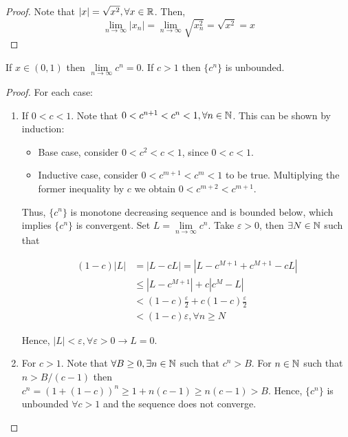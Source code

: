 \begin{proof}
    Note that $|x| = \sqrt{x^2}, \forall x \in \mathbb{R}$. Then,
    \begin{equation*}
        \lim \limits_{n\to \infty} |x_n| = \lim \limits_{n\to \infty} \sqrt{x_n^2} = \sqrt{x^2} = x
    \end{equation*}
\end{proof}

\begin{theorem}
    If $x \in (0,1)$ then $\lim \limits_{n \to \infty} c^n = 0$. If $c > 1$ then $\{c^n\}$ is unbounded.
\end{theorem}

\begin{proof}
    For each case:
    \begin{enumerate}
        \item If $0 < c < 1$. Note that $0 < c^{n+1} < c^n < 1, \forall n \in \mathbb{N}$. This can be shown by induction:
        \begin{itemize}
            \item Base case, consider $0 < c^2 < c < 1$, since $0 < c < 1$.
            \item Inductive case, consider $0 < c^{m+1} < c^m < 1$ to be true. Multiplying the former inequality by $c$ we obtain $0 < c^{m+2} < c^{m+1}$.
        \end{itemize}
        Thus, $\{c^n\}$ is monotone decreasing sequence and is bounded below, which implies $\{c^n\}$ is convergent. Set $L = \lim \limits_{n \to \infty} c^n$. Take $\varepsilon > 0$, then $\exists N \in \mathbb{N}$ such that
        
        \begin{align*}
            (1-c)|L| &= |L-cL| = |L - c^{M+1} + c^{M+1} - cL| \\
            &\leq |L-c^{M+1}| + c|c^M-L| \\
            &< (1-c)\frac{\varepsilon}{2} + c(1-c)\frac{\varepsilon}{2} \\
            &< (1-c) \varepsilon, \forall n \geq N
        \end{align*}
        
        Hence, $|L| < \varepsilon, \forall \varepsilon>0 \longrightarrow L = 0$.
        \item For $c > 1$. Note that $\forall B \geq 0, \exists n \in \mathbb{N}$ such that $c^n > B$. For $n \in \mathbb{N}$ such that $n > B/(c-1)$ then $c^n = (1+(1-c))^n \geq 1 + n(c-1) \geq n(c-1) > B$. Hence, $\{c^n\}$ is unbounded $\forall c > 1$ and the sequence does not converge.
    \end{enumerate}
\end{proof}

